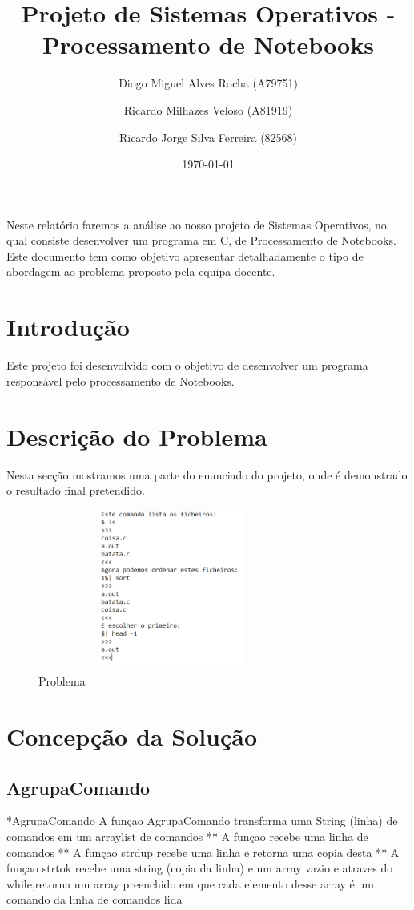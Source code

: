\documentclass[a4paper]{article}
\title{Projeto de Sistemas Operativos - Processamento de Notebooks }
\author{Diogo Miguel Alves Rocha (A79751)\and Ricardo Milhazes Veloso (A81919) \and Ricardo Jorge Silva Ferreira (82568)}
\date{\today}
\begin{document}
\maketitle

Neste relatório faremos a análise ao nosso projeto de Sistemas Operativos, no qual consiste desenvolver um programa em C, de Processamento de Notebooks. Este documento tem como objetivo apresentar detalhadamente o tipo de abordagem ao problema proposto pela equipa docente.

\tableofcontents

\section{Introdução}
\label{sec:intro}
Este projeto foi desenvolvido com o objetivo de desenvolver um programa responsável pelo processamento de Notebooks.

\section{Descrição do Problema}
\label{sec:descricao do problema}
Nesta secção mostramos uma parte do enunciado do projeto, onde é demonstrado o resultado final pretendido.

\begin{figure}[H]
				\centering
				\includegraphics[width = 250pt,height = 150pt]{so.png}
				\caption{Problema}
			\end{figure}


\section{Concepção da Solução}
\label{sec:solucao}

\subsection{AgrupaComando}
*AgrupaComando
A funçao AgrupaComando transforma uma String (linha) de comandos em um arraylist de comandos
** A funçao recebe uma linha de comandos
** A funçao strdup recebe uma linha e retorna uma copia desta
** A funçao strtok recebe uma string (copia da linha) e um array vazio e atraves do while,retorna um array preenchido em que cada elemento desse array é um comando da linha de comandos lida
\end{document}
